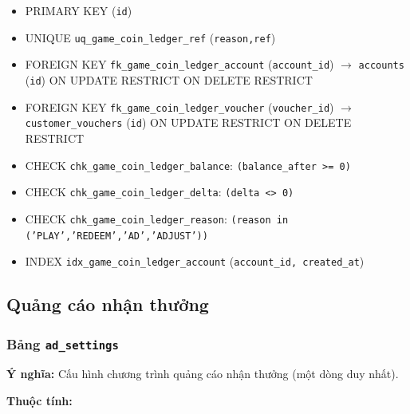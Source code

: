 \begin{itemize}

\item PRIMARY KEY (\texttt{id})

\item UNIQUE \texttt{uq\_game\_coin\_ledger\_ref} (\texttt{reason,ref})

\item FOREIGN KEY \texttt{fk\_game\_coin\_ledger\_account} (\texttt{account\_id}) $\rightarrow$ \texttt{accounts} (\texttt{id}) ON UPDATE RESTRICT ON DELETE RESTRICT

\item FOREIGN KEY \texttt{fk\_game\_coin\_ledger\_voucher} (\texttt{voucher\_id}) $\rightarrow$ \texttt{customer\_vouchers} (\texttt{id}) ON UPDATE RESTRICT ON DELETE RESTRICT

\item CHECK \texttt{chk\_game\_coin\_ledger\_balance}: \texttt{(balance\_after >= 0)}

\item CHECK \texttt{chk\_game\_coin\_ledger\_delta}: \texttt{(delta <> 0)}

\item CHECK \texttt{chk\_game\_coin\_ledger\_reason}: \texttt{(reason in ('PLAY','REDEEM','AD','ADJUST'))}

\item INDEX \texttt{idx\_game\_coin\_ledger\_account} (\texttt{account\_id, created\_at})

\end{itemize}

\subsection{Quảng cáo nhận thưởng}

\subsubsection{Bảng \texttt{ad\_settings}}

\textbf{Ý nghĩa:} Cấu hình chương trình quảng cáo nhận thưởng (một dòng duy nhất).\par

\textbf{Thuộc tính:}

